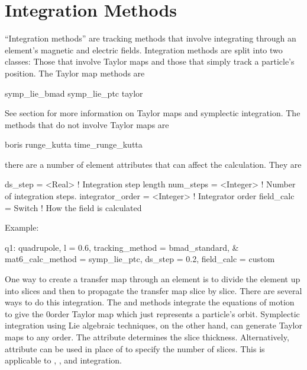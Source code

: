 \section{Integration Methods}
\label{s:integ}

``Integration methods'' are tracking methods that involve integrating
through an element's magnetic and electric fields.  Integration
methods are split into two classes: Those that involve Taylor maps and
those that simply track a particle's position.  The Taylor map methods
are
\begin{example}
  symp_lie_bmad
  symp_lie_ptc
  taylor
\end{example}
See section  for more information on Taylor maps
and symplectic integration.  The methods that do not involve Taylor
maps are
\begin{example}
  boris
  runge_kutta
  time_runge_kutta
\end{example}

there are a number of element attributes that can affect the
calculation. They are
\begin{example}
  ds_step = <Real>              ! Integration step length
  num_steps = <Integer>         ! Number of integration steps.
  integrator_order = <Integer>  ! Integrator order
  field_calc = Switch           ! How the field is calculated
\end{example}

Example:
\begin{example}
  q1: quadrupole, l = 0.6, tracking_method = bmad_standard, &
        mat6_calc_method = symp_lie_ptc, ds_step = 0.2, field_calc = custom
\end{example}

One way to create a transfer map through an element is to divide the
element up into slices and then to propagate the transfer map slice by
slice.  There are several ways to do this integration. The 
and  methods integrate the equations of motion to
give the 0\Th order Taylor map which just represents a particle's
orbit.  Symplectic integration using Lie
algebraic techniques, on the other hand, can generate Taylor maps to
any order.  The  attribute determines the slice thickness.
Alternatively,  attribute can be used in place of
 to specify the number of slices.
This is applicable to , , and
 integration.

